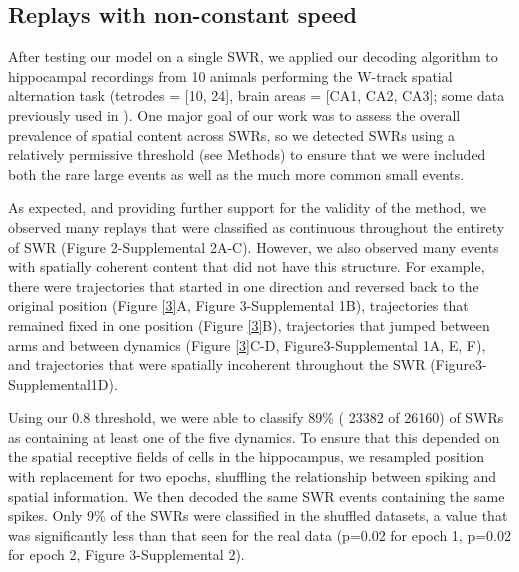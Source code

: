 \documentclass[times, twoside]{zHenriquesLab-StyleBioRxiv}
\begin{document}
\subsection*{Replays with non-constant speed}

After testing our model on a single SWR, we applied our decoding algorithm to hippocampal recordings from 10 animals performing the W-track spatial alternation task (tetrodes = [10, 24], brain areas = [CA1, CA2, CA3]; some data previously used in \cite{KarlssonAwakereplayremote2009, KayConstantSubsecondCycling2020}). One major goal of our work was to assess the overall prevalence of spatial content across SWRs, so we detected SWRs using a relatively permissive threshold (see Methods) to ensure that we were included both the rare large events as well as the much more common small events. 

As expected, and providing further support for the validity of the method, we observed many replays that were classified as continuous throughout the entirety of SWR (Figure 2-Supplemental 2A-C). However, we also observed many events with spatially coherent content that did not have this structure. For example, there were trajectories that started in one direction and reversed back to the original position (Figure \ref{3}A, Figure 3-Supplemental 1B), trajectories that remained fixed in one position (Figure \ref{3}B), trajectories that jumped between arms and between dynamics (Figure \ref{3}C-D, Figure3-Supplemental 1A, E, F), and trajectories that were spatially incoherent throughout the SWR (Figure3-Supplemental1D).

Using our 0.8 threshold, we were able to classify 89\% ( 23382 of 26160) of SWRs as containing at least one of the five dynamics. To ensure that this depended on the spatial receptive fields of cells in the hippocampus, we resampled position with replacement for two epochs, shuffling the relationship between spiking and spatial information. We then decoded the same SWR events containing the same spikes. Only 9\% of the SWRs were classified in the shuffled datasets, a value that was significantly less than that seen for the real data (p=0.02 for epoch 1, p=0.02 for epoch 2, Figure 3-Supplemental 2).
\end{document}
